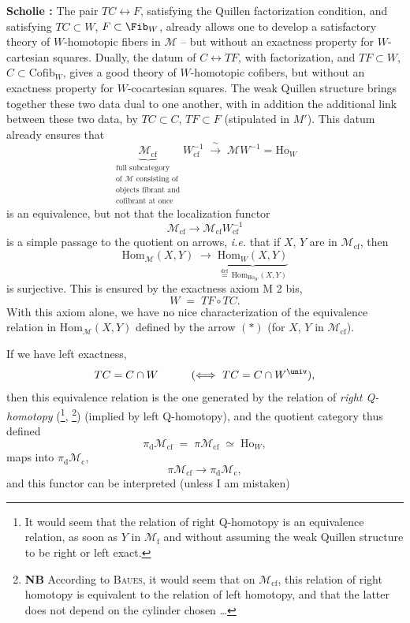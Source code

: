 \noindent\textbf{Scholie :} The pair $TC \longleftrightarrow F$, satisfying the Quillen factorization condition, and satisfying $TC \subset W$, $F \subset \Fib_W$, already allows one to develop a satisfactory theory of $W$-homotopic fibers in $\mathcal{M}$ -- but without an exactness property for $W$-cartesian squares. Dually, the datum of $C \longleftrightarrow TF$, with factorization, and $TF \subset W$, $C \subset \mathrm{Cofib}_W$, gives a good theory of $W$-homotopic cofibers, but without an exactness property for $W$-cocartesian squares. The weak Quillen structure brings together these two data dual to one another, with in addition the additional link between these two data, by $TC \subset C$, $TF \subset F$ (stipulated in $M'$). This datum already ensures that %
\[
\underbrace{\mathcal{M}_{\mathrm{cf}}}_{\substack{\text{full subcategory}\\ \text{of $\mathcal{M}$ consisting of}\\ \text{objects fibrant and}\\ \text{cofibrant at once}}} W_{\mathrm{cf}}^{-1} \;\xrightarrow{\ \sim\ }\; \mathcal{M}W^{-1} = \mathrm{Ho}_W
\]
is an equivalence, but not that the localization functor
\[
\mathcal{M}_{\mathrm{cf}} \longrightarrow \mathcal{M}_{\mathrm{cf}}W_{\mathrm{cf}}^{-1}
\]
is a simple passage to the quotient on arrows, \textit{i.e.} that if $X$, $Y$ are in $\mathcal{M}_{\mathrm{cf}}$, then
\[
\mathrm{Hom}_{\mathcal{M}}(X, Y) \;\longrightarrow\; \underbrace{\mathrm{Hom}_W(X, Y)}_{\overset{\text{def}}{=}\,\mathrm{Hom}_{\mathrm{Ho}_W}(X, Y)} \tag*{$(*)$}
\]
is surjective. This is ensured by the exactness axiom M 2 bis,
\[
W \;=\; TF \circ TC.
\]
With this axiom alone, we have no nice characterization of the equivalence relation in $\mathrm{Hom}_{\mathcal{M}}(X, Y)$ defined by the arrow $(*)$ (for $X$, $Y$ in $\mathcal{M}_{\mathrm{cf}}$).

If we have left exactness,
\[
TC = C \cap W \qquad\quad (\Longleftrightarrow\ TC = C \cap W^{\univ}),
\]
then this equivalence relation is the one generated by the relation of \textit{right Q-homotopy} (\footnote[22]{It would seem that the relation of right Q-homotopy is an equivalence relation, as soon as $Y$ in $\mathcal{M}_{\mathrm{f}}$ and without assuming the weak Quillen structure to be right or left exact.}, \footnote[23]{\textbf{NB} According to \textsc{Baues}, it would seem that on $\mathcal{M}_{\mathrm{cf}}$, this relation of right homotopy is equivalent to the relation of left homotopy, and that the latter does not depend on the cylinder chosen \ldots}) (implied by left Q-homotopy), and the quotient category thus defined
\[
\pi_{\mathrm{d}}\mathcal{M}_{\mathrm{cf}} \;=\; \pi\mathcal{M}_{\mathrm{cf}} \;\simeq\; \mathrm{Ho}_W,
\]
maps into $\pi_{\mathrm{d}}\mathcal{M}_{\mathrm{c}}$,
\[
\pi\mathcal{M}_{\mathrm{cf}} \longrightarrow \pi_{\mathrm{d}}\mathcal{M}_{\mathrm{c}},
\]
and this functor can be interpreted (unless I am mistaken)